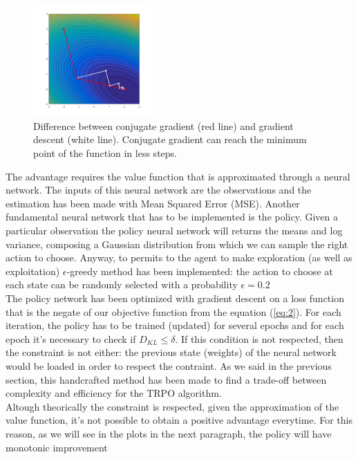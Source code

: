 \documentclass[11pt]{article}
\begin{document}
\begin{figure}
        \includegraphics[width=0.4\textwidth]{gradient}
        \centering
        \caption{Difference between conjugate gradient (red line) and gradient descent
        (white line). Conjugate gradient can reach the minimum point of
        the function in less steps.}
        \label{fig:gradient}
\end{figure}
The advantage requires the value function that is approximated through a neural network.
The inputs of this neural network are the observations and the estimation has been made
with Mean Squared Error (MSE). Another fundamental neural network that has to be
implemented is the policy. Given a particular observation the policy neural network will
returns the means and log variance, composing a Gaussian distribution from which we can
sample the right action to choose. Anyway, to permits to the agent to make exploration (as
well as exploitation) $\epsilon$-greedy method has been implemented: the action to choose
at each state can be randomly selected with a probability $\epsilon=0.2$ 
\\
The policy network has been optimized with gradient descent on a loss function that is the negate of
our objective function from the equation (\ref{eq:2}). For each iteration, the policy has
to be trained (updated) for several epochs and for each epoch it's necessary to check if
$D_{KL} \leq \delta$. If this condition is not respected, then the constraint is not
either: the previous state (weights) of the neural network would be loaded in order to respect the
contraint. As we said in the previous section, this handcrafted method has been made to
find a trade-off between complexity and efficiency for the TRPO algorithm. \\
Altough theorically the constraint is respected, given the approximation of the value
function, it's not possible to obtain a positive advantage everytime. For this reason, as
we will see in the plots in the next paragraph, the policy will have monotonic improvement
\end{document}
